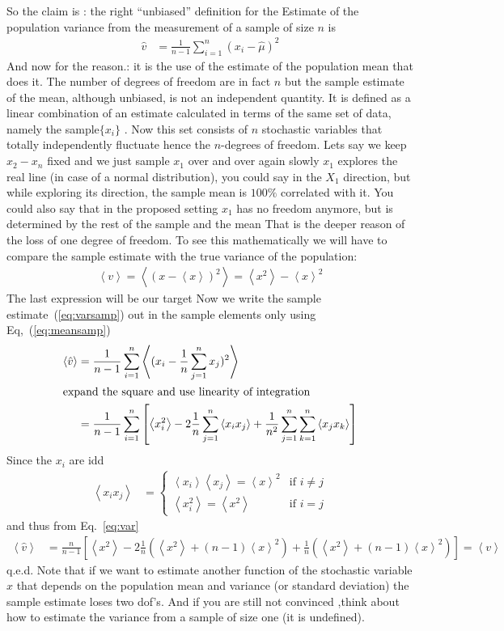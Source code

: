 \documentclass[a4paper,10pt]{article}
\newcommand{\vev}[1]{ \left\langle #1 \right\rangle}
\begin{document}
So the claim is : the right ``unbiased'' definition for  the Estimate of the population variance from the measurement of a sample of size $n$  is
\begin{align}
  \hat{v} &= \frac{1}{n-1}\sum_{i=1}^n (x_i-\hat{\mu})^2 \label{eq:varsamp}
\end{align}
And now for the reason.: it is the use of the estimate of the population mean that does it. The number of degrees of freedom are in fact $n$ but the sample estimate of the mean, although unbiased, is not an independent quantity. It is defined as a linear combination of an estimate calculated in terms of the same set of data, namely the sample$\{x_i\}$ .  Now this set consists of $n$ stochastic variables that totally independently fluctuate hence the $n$-degrees of freedom. Lets say we keep $x_2-x_n$ fixed  and we just sample $x_1$ over and over again slowly $x_1$ explores the real line (in case of a normal distribution), you could say in the $X_1$ direction, but while exploring its direction, the sample mean is $100\%$  correlated with it.  You could also say that in the proposed setting $x_1$ has no freedom anymore, but is determined by the rest of the sample and the mean
That is the deeper reason of the loss of one degree of freedom. To see this mathematically we will have to compare the sample estimate with the true variance of the population:
\begin{align}
  \vev{v}= \vev{(x-\vev{x})^2} = \vev{x^2}-\vev{x}^2\label{eq:var}
\end{align}
The last expression will be our target
Now we  write the sample  estimate~(\ref{eq:varsamp}) out in the sample elements only using Eq,~(\ref{eq:meansamp})
\begin{align*}
 \vev{\hat{v}} & =   \frac{1}{n-1}\sum_{i=1}^n \vev{(x_i- \frac{1}{n}\sum_{j=1}^nx_j)^2}\\
 \intertext{expand the square and use linearity of  integration}
  & =   \frac{1}{n-1}\sum_{i=1}^n\left[ \vev{x_i^2}- 2\frac{1}{n}\sum_{j=1}^n\vev{x_ix_j}   +\frac{1}{n^2}\sum_{j=1}^n\sum_{k=1}^n\vev{x_jx_k}\right]
\end{align*}
Since the $x_i$ are idd
\begin{align*}
\vev{x_ix_j}&=\begin{cases}
               \vev{x_i}\vev{x_j}= \vev{x}^2& \text{if }i\neq j\\
                \vev{x_i^2}=\vev{x^2}&  \text{if }i=j
              \end{cases}
\end{align*}
and thus from Eq.~\eqref{eq:var}
\begin{align*}
  \vev{\hat{v}} & =    \frac{n}{n-1}\left[ \vev{x^2}- 2\frac{1}{n}(\vev{x^2}+(n-1)\vev{x}^2)   +\frac{1}{n}(\vev{x^2}+(n-1)\vev{x}^2)\right] =\vev{v}
\end{align*}
q.e.d.
Note that if we want to estimate another function of the stochastic variable $x$ that depends on the population mean and variance (or standard deviation) the sample estimate loses two dof's. 
And if you are still not convinced ,think about how to estimate the variance from a sample of size one (it is undefined).
\end{document}
